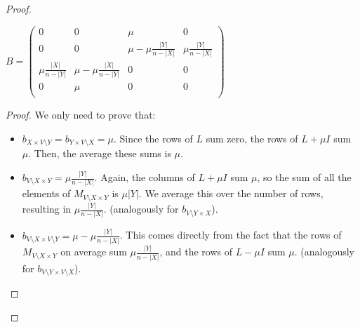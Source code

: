 \begin{problem}
\begin{sol}
\begin{proof}
            \begin{claim}
                $B =
                \begin{pmatrix}
                    0                     & 0                           & \mu                         & 0                     \\
                    0                     & 0                           & \mu - \mu \frac{|Y|}{n-|X|} & \mu \frac{|Y|}{n-|X|} \\
                    \mu \frac{|X|}{n-|Y|} & \mu - \mu \frac{|X|}{n-|Y|} & 0                           & 0                     \\
                    0                     & \mu                         & 0                           & 0                     \\
                \end{pmatrix}$
                \begin{proof}
                    We only need to prove that:
                    \begin{itemize}
                        \item $b_{X \times V \setminus Y} = b_{Y \times V \setminus X} = \mu$.
                        Since the rows of $L$ sum zero, the rows of $L + \mu I$ sum $\mu$.
                        Then, the average these sums is $\mu$.
                        \item $b_{V \setminus X \times Y} = \mu \frac{|Y|}{n-|X|}$.
                        Again, the columns of $L + \mu I$ sum $\mu$, so the sum of all the elements of $M_{V \setminus X \times Y}$ is $\mu |Y|$.
                        We average this over the number of rows, resulting in $\mu \frac{|Y|}{n - |X|}$.
                        (analogously for $b_{V \setminus Y \times X}$).
                        \item $b_{V \setminus X \times V \setminus Y} = \mu - \mu \frac{|Y|}{n-|X|}$.
                        This comes directly from the fact that the rows of $M_{V \setminus X \times Y}$ on average sum $\mu \frac{|Y|}{n - |X|}$, and the rows of $L - \mu I$ sum $\mu$.
                        (analogously for $b_{V \setminus Y \times V \setminus X}$).
                    \end{itemize}
                \end{proof}

            \end{claim}


\end{proof}
\end{sol}
\end{problem}
